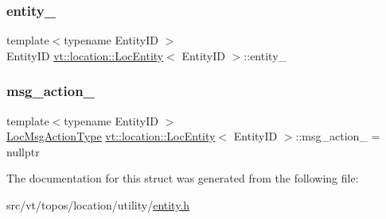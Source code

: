 \subsubsection{\texorpdfstring{entity\+\_\+}{entity\_}}
{\footnotesize\ttfamily template$<$typename Entity\+ID $>$ \\
Entity\+ID \hyperlink{structvt_1_1location_1_1_loc_entity}{vt\+::location\+::\+Loc\+Entity}$<$ Entity\+ID $>$\+::entity\+\_\+\hspace{0.3cm}{\ttfamily [private]}}

\mbox{\label{structvt_1_1location_1_1_loc_entity_adb5c5c69306a18af15b7af3050a45dfa}} 
\subsubsection{\texorpdfstring{msg\+\_\+action\+\_\+}{msg\_action\_}}
{\footnotesize\ttfamily template$<$typename Entity\+ID $>$ \\
\hyperlink{namespacevt_1_1location_ad0a130e4d79e745543925240e13e8f08}{Loc\+Msg\+Action\+Type} \hyperlink{structvt_1_1location_1_1_loc_entity}{vt\+::location\+::\+Loc\+Entity}$<$ Entity\+ID $>$\+::msg\+\_\+action\+\_\+ = nullptr\hspace{0.3cm}{\ttfamily [private]}}



The documentation for this struct was generated from the following file\+:\begin{DoxyCompactItemize}
\item 
src/vt/topos/location/utility/\hyperlink{entity_8h}{entity.\+h}\end{DoxyCompactItemize}
